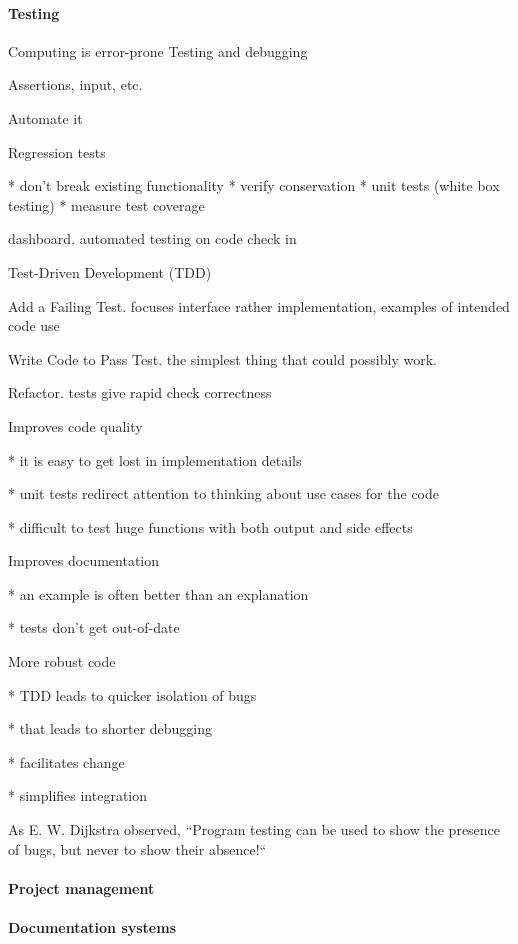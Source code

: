 \documentclass[ChapterTOCs,krantz2]{krantz} %
\begin{document}
\paragraph{ {\bf Testing}}
Computing is error-prone
Testing and debugging

Assertions, input, etc.

Automate it

Regression tests

* don't break existing functionality
* verify conservation
* unit tests (white box testing)
* measure test coverage

dashboard. automated testing on code check in

Test-Driven Development (TDD)

Add a Failing Test. focuses interface rather implementation, examples of intended code use 

Write Code to Pass Test. the simplest thing that could possibly work.

Refactor. tests give rapid check correctness

Improves code quality

* it is easy to get lost in implementation details

* unit tests redirect attention to thinking about use cases for the code

* difficult to test huge functions with both output and side effects

Improves documentation

* an example is often better than an explanation

* tests don't get out-of-date

More robust code

* TDD leads to quicker isolation of bugs

* that leads to shorter debugging

* facilitates change

* simplifies integration

As E. W. Dijkstra observed, ``Program testing can be used to show the presence
of bugs, but never to show their absence!`` \cite{dahl1972structured}

\paragraph{ {\bf Project management}}

\paragraph{ {\bf Documentation systems}}
\end{document}
